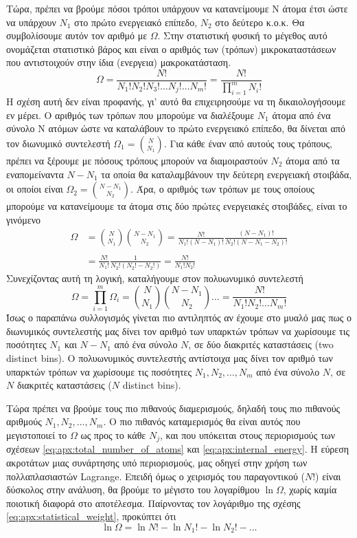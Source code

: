 Τώρα, πρέπει να βρούμε πόσοι τρόποι υπάρχουν να κατανείμουμε N άτομα έτσι ώστε να υπάρχουν $ N_1$ στο πρώτο ενεργειακό επίπεδο, $ N_2$ στο δεύτερο κ.ο.κ. Θα συμβολίσουμε αυτόν τον αριθμό με $ \Omega$. Στην στατιστική φυσική το μέγεθος αυτό ονομάζεται στατιστικό βάρος και είναι ο αριθμός των (τρόπων) μικροκαταστάσεων που αντιστοιχούν στην ίδια (ενεργεια) μακροκατάσταση.
\begin{equation}
    \label{eq:apx:statistical_weight}
     \Omega = \frac{N!}{N_1! N_2! N_3! \dots N_j! \dots N_m!} = \frac{N!}{\prod_{i=1}^{m}N_i!}
\end{equation}
Η σχέση αυτή δεν είναι προφανής, γι' αυτό θα επιχειρησούμε να τη δικαιολογήσουμε εν μέρει. Ο αριθμός των τρόπων που μπορούμε να διαλέξουμε $ N_1$ άτομα από ένα σύνολο N ατόμων ώστε να καταλάβουν το πρώτο ενεργειακό επίπεδο, θα δίνεται από τον διωνυμικό συντελεστή $ \Omega_1 = {N \choose N_1}$. Για κάθε έναν από αυτούς τους τρόπους, πρέπει να ξέρουμε με πόσους τρόπους μπορούν να διαμοιραστούν $ N_2$ άτομα από τα εναπομείναντα $ N - N_1$ τα οποία θα καταλαμβάνουν την δεύτερη ενεργειακή στοιβάδα, οι οποίοι είναι $ \Omega_2 = {N - N_1 \choose N_2}$. Άρα, ο αριθμός των τρόπων με τους οποίους μπορούμε να κατανείμουμε τα άτομα στις δύο πρώτες ενεργειακές στοιβάδες, είναι το γινόμενο 
\begin{align*}
     \Omega &= { N \choose N_1} { N - N_1 \choose N_2} =  \frac{N!}{N_1! (N-N_1)!} \frac{(N-N_1)!}{N_2! (N-N_1 -N_2)!} \\\\
    &=  \frac{N!}{N_1!} \frac{1}{N_2!(N_2! - N_2!)} = \frac{N!}{N_1!N_2!}
\end{align*}
Συνεχίζοντας αυτή τη λογική, καταλήγουμε στον πολυωνυμικό συντελεστή
$$ \Omega = \prod_{i=1}^{m} \Omega_i =  { N \choose N_1} { N - N_1 \choose N_2} \dots = \frac{N!}{N_1!N_2! \dots N_m!}$$
Ίσως ο παραπάνω συλλογισμός γίνεται πιο αντιληπτός αν έχουμε στο μυαλό μας πως ο διωνυμικός συντελεστής μας δίνει τον αριθμό των υπαρκτών τρόπων να χωρίσουμε τις ποσότητες $ N_1$ και $ N - N_1$ από ένα σύνολο $ N$, σε δύο διακριτές καταστάσεις (two distinct bins). Ο πολυωνυμικός συντελεστής αντίστοιχα μας δίνει τον αριθμό των υπαρκτών τρόπων να χωρίσουμε τις ποσότητες $ N_1, N_2, \dots , N_m$ από ένα σύνολο $ N$, σε $ N$ διακριτές καταστάσεις ($ N$ distinct bins).

Τώρα πρέπει να βρούμε τους πιο πιθανούς διαμερισμούς, δηλαδή τους πιο πιθανούς αριθμούς $ N_1, N_2, \dots , N_m$. Ο πιο πιθανός καταμερισμός θα είναι αυτός που μεγιστοποιεί το $ \Omega$ ως προς το κάθε $ N_j$, και που υπόκειται στους περιορισμούς των σχέσεων \eqref{eq:apx:total_number_of_atoms} και \eqref{eq:apx:internal_energy}. Η εύρεση ακροτάτων μιας συνάρτησης υπό περιορισμούς, μας οδηγεί στην χρήση των πολλαπλασιαστών Lagrange. Επειδή όμως ο χειρισμός του παραγοντικού ($ N!$) είναι δύσκολος στην ανάλυση, θα βρούμε το μέγιστο του λογαρίθμου $ \ln{\Omega}$, χωρίς καμία ποιοτική διαφορά στο αποτέλεσμα. Παίρνοντας τον λογάριθμο της σχέσης \eqref{eq:apx:statistical_weight}, προκύπτει ότι
\begin{equation}
    \label{eq:apx:log_statistical_weight}
     \ln{\Omega} = \ln{N!} - \ln{N_1!} - \ln{N_2!} - \dots
\end{equation}

